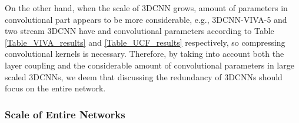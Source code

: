 \documentclass[a4paper,fleqn]{cas-dc}
\begin{document}
On the other hand, when the scale of 3DCNN grows, amount of parameters in convolutional part appears to be more considerable, e.g., 3DCNN-VIVA-5 and two stream 3DCNN have  and  convolutional parameters according to Table \ref{Table_VIVA_results} and \ref{Table_UCF_results} respectively, so compressing convolutional kernels is necessary. Therefore, by taking into account both the layer coupling and the considerable amount of convolutional parameters in large scaled 3DCNNs, we deem that discussing the redundancy of 3DCNNs should focus on the entire network.

\begin{table}
\caption{\textbf{Compressing different parts of 3DCNN-VIVA-1.} The ``Base'' column denotes the uncompressed network.}
\label{Table_coupling}
  \centering
  \renewcommand\arraystretch{1.6}
\end{table}

\subsubsection{Scale of Entire Networks}\quad
\end{document}
